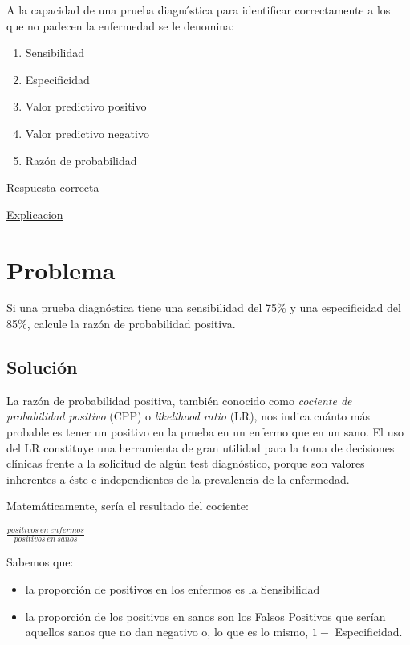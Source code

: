\documentclass[
]{book}
\providecommand{\tightlist}{%
  \setlength{\itemsep}{0pt}\setlength{\parskip}{0pt}}
\begin{document}
A la capacidad de una prueba diagnóstica para identificar correctamente a los que no padecen la enfermedad se le denomina:

\begin{enumerate}
\def\labelenumi{\alph{enumi})}
\tightlist
\item
  Sensibilidad
\item
  Especificidad
\item
  Valor predictivo positivo
\item
  Valor predictivo negativo
\item
  Razón de probabilidad
\end{enumerate}

Respuesta correcta

\href{https://1fjmanzano.github.io/bioestadistica/relaci\%C3\%B3n-entre-variables-cualitativas.html\#diagno\%CC\%81stico-cli\%CC\%81nico}{Explicacion}

\hypertarget{problema-17}{%
\section{Problema}\label{problema-17}}

Si una prueba diagnóstica tiene una sensibilidad del 75\% y una especificidad del 85\%, calcule la razón de probabilidad positiva.

\hypertarget{soluciuxf3n-13}{%
\subsection{Solución}\label{soluciuxf3n-13}}

La razón de probabilidad positiva, también conocido como \emph{cociente de probabilidad positivo} (CPP) o \emph{likelihood ratio} (LR), nos indica cuánto más probable es tener un positivo en la prueba en un enfermo que en un sano. El uso del LR constituye una herramienta de gran utilidad para la toma de decisiones clínicas frente a la solicitud de algún test diagnóstico, porque son valores inherentes a éste e independientes de la prevalencia de la enfermedad.

Matemáticamente, sería el resultado del cociente:

\(\frac{positivos ~ en ~ enfermos}{positivos ~ en ~ sanos}\)

Sabemos que:

\begin{itemize}
\tightlist
\item
  la proporción de positivos en los enfermos es la Sensibilidad
\item
  la proporción de los positivos en sanos son los Falsos Positivos que serían aquellos sanos que no dan negativo o, lo que es lo mismo, \(1 -\) Especificidad.
\end{itemize}
\end{document}
